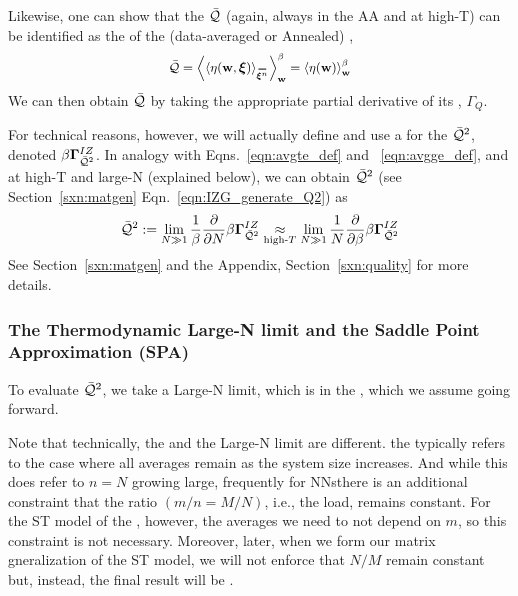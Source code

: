 Likewise, one can show that the \Quality $\bar{\mathcal{Q}}$
(again, always in the AA and at high-T) can be identified as the \ThermalAverage of the (data-averaged or Annealed)
\SelfOverlap, 
\begin{align}
  \label{eqn:Q_def_eta}
  \Q = \THRMAVGw{\langle\ETA(\WVEC,\XI)\rangle_{\AVGNDXIn}} =\THRMAVGw{\ETA(\WVEC)}
\end{align}
We can then obtain $\bar{\mathcal{Q}}$ by taking the appropriate partial derivative of its \GeneratingFunction, $\Gamma_{Q}$.

For technical reasons, however, we will actually define and use a
\GeneratingFunction for the \AverageLayerQualitySquared $\bar{\mathcal{Q}}^{2}$, denoted $\beta\mathbf{\Gamma}^{IZ}_{\bar{\mathcal{Q}}^{2}}$.
In analogy with Eqns.~\ref{eqn:avgte_def} and ~\ref{eqn:avgge_def}, and at high-T and large-N (explained below),
we can obtain $\bar{\mathcal{Q}}^{2}$ (see Section~\ref{sxn:matgen} Eqn.~\ref{eqn:IZG_generate_Q2}) as
\begin{align}
  \label{eqn:QT_def}
  \bar{\mathcal{Q}}^{2} := \lim_{N\gg 1}\frac{1}{\beta}\frac{\partial }{\partial N}\beta\mathbf{\Gamma}^{IZ}_{\bar{\mathcal{Q}}^{2}}
  \underset{\text{high-}T}{\approx}
\lim_{N\gg 1}\frac{1}{N}\frac{\partial }{\partial \beta}\beta\mathbf{\Gamma}^{IZ}_{\bar{\mathcal{Q}}^{2}}
\end{align}
See Section~\ref{sxn:matgen} and the Appendix, Section~\ref{sxn:quality} for more details.


\subsubsection{The Thermodynamic Large-N limit and the Saddle Point Approximation (SPA)}
\label{sxn:largeN_and_SPA}
To evaluate $\bar{\mathcal{Q}}^{2}$, we take a Large-N limit, which is 
in the \ThermodynamicLimit, which we assume going forward.

Note that technically,  the \ThermodynamicLimit and the Large-N limit are different.
the \ThermodynamicLimit typically refers to the case where all \Thermodynamic averages
remain \SizeIntensive as the system size increases.
And while this does refer to $n=N$ growing large, frequently for NNsthere is an additional
constraint that the ratio $(m/n = M/N)$, i.e., the load, remains constant.\cite{SST92,MM17_TR_v1}
For the ST model of the \Perceptron, however, the \Thermodynamic averages we need to not depend on $m$,
so this constraint is not necessary.
Moreover, later, when we form our matrix gneralization of the ST model, we will not
enforce that $N/M$ remain constant but, instead, the final result will be \SizeConsistent.

